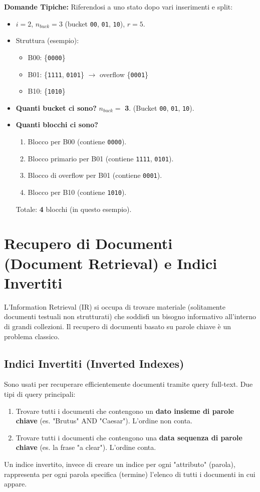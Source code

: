 \textbf{Domande Tipiche:}
Riferendosi a uno stato dopo vari inserimenti e split:
\begin{itemize}
    \item $i=2$, $n_{buck}=3$ (bucket \texttt{00}, \texttt{01}, \texttt{10}), $r=5$.
    \item Struttura (esempio):
    \begin{itemize}
        \item B00: \{\texttt{0000}\}
        \item B01: \{\texttt{1111}, \texttt{0101}\} $\rightarrow$ overflow \{\texttt{0001}\}
        \item B10: \{\texttt{1010}\}
    \end{itemize}
    \item \textbf{Quanti bucket ci sono?} $n_{buck} =$ \textbf{3}. (Bucket \texttt{00}, \texttt{01}, \texttt{10}).
    \item \textbf{Quanti blocchi ci sono?}
    \begin{enumerate}
        \item Blocco per B00 (contiene \texttt{0000}).
        \item Blocco primario per B01 (contiene \texttt{1111}, \texttt{0101}).
        \item Blocco di overflow per B01 (contiene \texttt{0001}).
        \item Blocco per B10 (contiene \texttt{1010}).
    \end{enumerate}
    Totale: \textbf{4} blocchi (in questo esempio).
\end{itemize}\section{Recupero di Documenti (Document Retrieval) e Indici Invertiti}
L'Information Retrieval (IR) si occupa di trovare materiale (solitamente documenti testuali non strutturati) che soddisfi un bisogno informativo all'interno di grandi collezioni. Il recupero di documenti basato su parole chiave è un problema classico.

\subsection{Indici Invertiti (Inverted Indexes)}
Sono usati per recuperare efficientemente documenti tramite query full-text.
Due tipi di query principali:
\begin{enumerate}
    \item Trovare tutti i documenti che contengono un \textbf{dato insieme di parole chiave} (es. "Brutus" AND "Caesar"). L'ordine non conta.
    \item Trovare tutti i documenti che contengono una \textbf{data sequenza di parole chiave} (es. la frase "a clear"). L'ordine conta.
\end{enumerate}
Un indice invertito, invece di creare un indice per ogni "attributo" (parola), rappresenta per ogni parola specifica (termine) l'elenco di tutti i documenti in cui appare.

